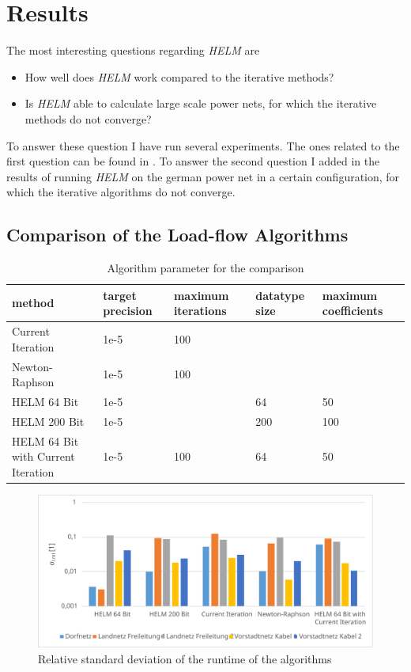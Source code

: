 \chapter{Results}
\label{sec:results}
The most interesting questions regarding \emph{HELM} are
\begin{itemize}
	\item How well does \emph{HELM} work compared to the iterative methods?
	\item Is \emph{HELM} able to calculate large scale power nets, for which the iterative methods do not converge?
\end{itemize}
To answer these question I have run several experiments. The ones related to the first question can be found in . To answer the second question I added in  the results of running \emph{HELM} on the german power net in a certain configuration, for which the iterative algorithms do not converge.

\section{Comparison of the Load-flow Algorithms}
\label{sec:comparison_algorithms}

\begin{table}
	\small
	\begin{tabularx}{\textwidth}{|X|p{1.5cm}|p{1.6cm}|p{1.5cm}|p{1.9cm}|}
		\hline
		method & target precision & maximum iterations & datatype size & maximum coefficients \\ \hline
		Current Iteration & 1e-5 & 100 & & \\ \hline
		Newton-Raphson & 1e-5 & 100 & & \\ \hline
		HELM 64 Bit & 1e-5 & & 64 & 50 \\ \hline
		HELM 200 Bit & 1e-5 & & 200 & 100 \\ \hline
		HELM 64 Bit with Current Iteration & 1e-5 & 100 & 64 & 50 \\ \hline
	\end{tabularx}
	\caption{Algorithm parameter for the comparison}
	\label{tab:comparison_parameter}
\end{table}

\begin{figure}
	\centering
	\includegraphics[scale=0.7]{figures/comparison_deviation}
	\caption[Comparison, relative standard deviation of runtime]{Relative standard deviation of the runtime of the algorithms}
	\label{fig:comparison_deviation}
\end{figure}

